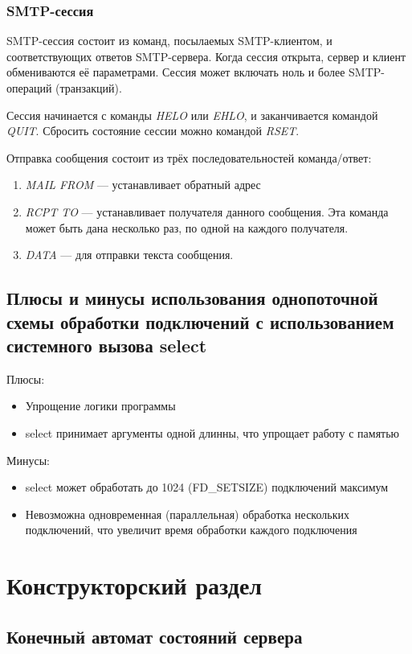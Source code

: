 \documentclass[a4paper,12pt]{report}
\begin{document}
\subsection{SMTP-сессия}
SMTP-сессия состоит из команд, посылаемых SMTP-клиентом, и соответствующих ответов SMTP-сервера.
Когда сессия открыта, сервер и клиент обмениваются её параметрами.
Сессия может включать ноль и более SMTP-операций (транзакций).

Сессия начинается с команды \textit{HELO} или \textit{EHLO}, и заканчивается командой \textit{QUIT}.
Сбросить состояние сессии можно командой \textit{RSET}.

Отправка сообщения состоит из трёх последовательностей команда/ответ:
\begin{enumerate}
    \item \textit{MAIL FROM} — устанавливает обратный адрес
    \item \textit{RCPT TO} — устанавливает получателя данного сообщения.
    Эта команда может быть дана несколько раз, по одной на каждого получателя.
    \item \textit{DATA} — для отправки текста сообщения.
\end{enumerate}

\section{Плюсы и минусы использования однопоточной схемы обработки подключений с использованием системного вызова select}
Плюсы:
\begin{itemize}
    \item Упрощение логики программы
    \item select принимает аргументы одной длинны, что упрощает работу с памятью
\end{itemize}

Минусы:
\begin{itemize}
    \item select может обработать до 1024 (FD\_SETSIZE) подключений максимум
    \item Невозможна одновременная (параллельная) обработка нескольких подключений, что увеличит время обработки каждого подключения
\end{itemize}

\chapter{Конструкторский раздел}

\section{Конечный автомат состояний сервера}
\end{document}
